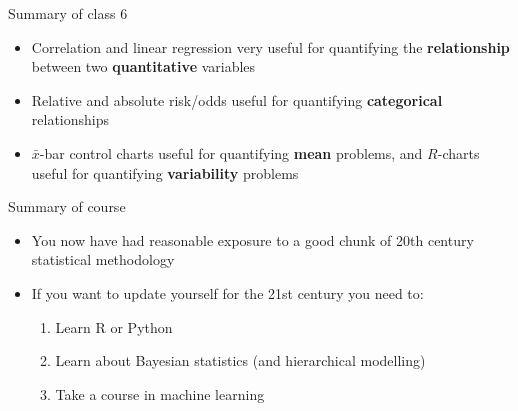 \documentclass[12pt,xcolor=dvipsnames,handout,mathserif,aspectratio=169]{beamer}
\newcommand{\bbl}[1]{{\color{NavyBlue} \textbf{#1}}}
\newcommand{\bre}[1]{{\color{red} \textbf{#1}}}
\newcommand{\bgr}[1]{{\color{PineGreen} \textbf{#1}}}
\begin{document}

\begin{frame}{Summary of class 6}

\begin{itemize}
\item Correlation and linear regression very useful for quantifying the \bbl{relationship} between two \bgr{quantitative} variables
\item Relative and absolute risk/odds useful for quantifying \bbl{categorical} relationships
\item $\bar{x}$-bar control charts useful for quantifying \bre{mean} problems, and $R$-charts useful for quantifying \bre{variability} problems
\end{itemize}
\end{frame}

\begin{frame}{Summary of course}

\begin{itemize}
\item You now have had reasonable exposure to a good chunk of 20th century statistical methodology
\item If you want to update yourself for the 21st century you need to:
\begin{enumerate}
\item Learn R or Python
\item Learn about Bayesian statistics (and hierarchical modelling)
\item Take a course in machine learning 
\end{enumerate}
\end{itemize}
\end{frame}
\end{document}

